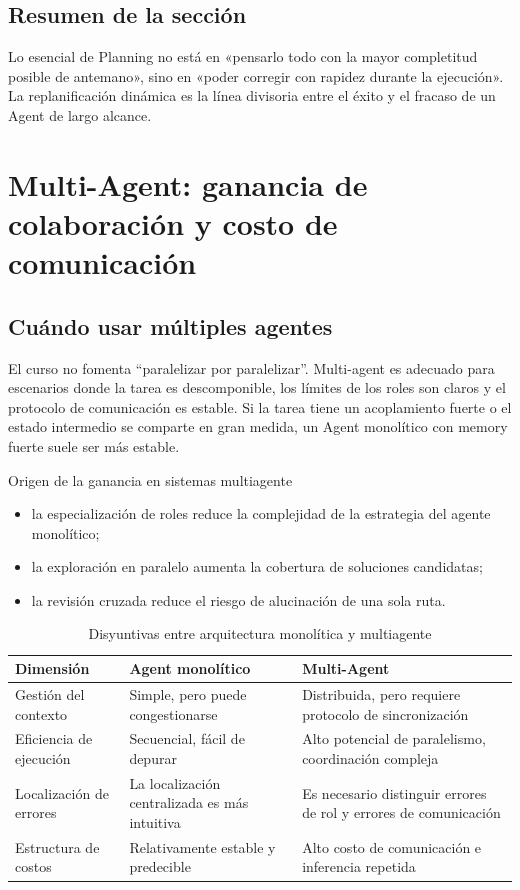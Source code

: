 \documentclass[a4paper]{article}
\begin{document}
\subsection{Resumen de la sección}
Lo esencial de Planning no está en «pensarlo todo con la mayor completitud posible de antemano», sino en «poder corregir con rapidez durante la ejecución». La replanificación dinámica es la línea divisoria entre el éxito y el fracaso de un Agent de largo alcance.

\section{Multi-Agent: ganancia de colaboración y costo de comunicación}

\subsection{Cuándo usar múltiples agentes}
El curso no fomenta ``paralelizar por paralelizar''. Multi-agent es adecuado para escenarios donde la tarea es descomponible, los límites de los roles son claros y el protocolo de comunicación es estable. Si la tarea tiene un acoplamiento fuerte o el estado intermedio se comparte en gran medida, un Agent monolítico con memory fuerte suele ser más estable.

\begin{knowledgebox}{Origen de la ganancia en sistemas multiagente}
\begin{itemize}
    \item la especialización de roles reduce la complejidad de la estrategia del agente monolítico;
    \item la exploración en paralelo aumenta la cobertura de soluciones candidatas;
    \item la revisión cruzada reduce el riesgo de alucinación de una sola ruta.
\end{itemize}
\end{knowledgebox}

\begin{table}[H]
\centering
\begin{tabular}{p{3.3cm}p{3.8cm}p{3.9cm}}
\toprule
\textbf{Dimensión} & \textbf{Agent monolítico} & \textbf{Multi-Agent} \\
\midrule
Gestión del contexto & Simple, pero puede congestionarse & Distribuida, pero requiere protocolo de sincronización \\
Eficiencia de ejecución & Secuencial, fácil de depurar & Alto potencial de paralelismo, coordinación compleja \\
Localización de errores & La localización centralizada es más intuitiva & Es necesario distinguir errores de rol y errores de comunicación \\
Estructura de costos & Relativamente estable y predecible & Alto costo de comunicación e inferencia repetida \\
\bottomrule
\end{tabular}
\caption{Disyuntivas entre arquitectura monolítica y multiagente}
\end{table}
\end{document}
